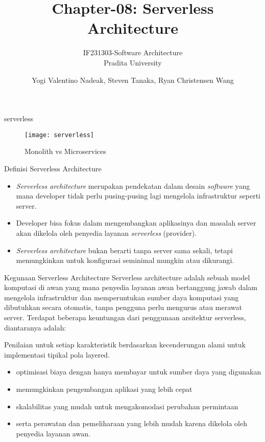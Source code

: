 \documentclass{beamer}
\title{Chapter-08: Serverless Architecture}
\subtitle{IF231303-Software Architecture\\Pradita University}
\author{Yogi Valentino Nadeak, Steven Tanaka, Ryan Christensen Wang}
\begin{document}
	\begin{frame}{serverless}
		\begin{figure}[h]
			\centering
			\texttt{[image: serverless]}
			\caption{Monolith vs Microservices}
			\label{fig:serverless}
		\end{figure}
	\end{frame}

    \begin{frame}[plain]
		\maketitle
	\end{frame}
	

    \begin{frame}{Definisi Serverless Architecture}
        \begin{itemize}
            \item \emph{Serverless architecture} merupakan pendekatan dalam desain \emph{software} yang mana developer tidak perlu pusing-pusing lagi mengelola infrastruktur seperti server.
            \item Developer bisa fokus dalam mengembangkan aplikasinya dan masalah server akan dikelola oleh penyedia layanan \emph{serverless} (provider).
            \item \emph{Serverless architecture} bukan berarti tanpa server sama sekali, tetapi memungkinkan untuk konfigurasi seminimal mungkin atau dikurangi.
        \end{itemize}
    \end{frame}


    \begin{frame}{Kegunaan Serverless Architecture}
        Serverless architecture adalah sebuah model komputasi di awan yang mana penyedia layanan awan bertanggung jawab dalam mengelola infrastruktur dan memperuntukan sumber daya komputasi yang dibutuhkan secara otomatis, tanpa pengguna perlu mengurus atau merawat server. Terdapat beberapa keuntungan dari penggunaan arsitektur serverless, diantaranya adalah:

        Penilaian untuk setiap karakteristik berdasarkan kecenderungan alami untuk implementasi tipikal pola layered.

        \begin{itemize}
            \item optimisasi biaya dengan hanya membayar untuk sumber daya yang digunakan
	        \item memungkinkan pengembangan aplikasi yang lebih cepat
	        \item skalabilitas yang mudah untuk mengakomodasi perubahan permintaan
	        \item serta perawatan dan pemeliharaan yang lebih mudah karena dikelola oleh penyedia layanan awan.
        \end{itemize}
    \end{frame}
\end{document}
